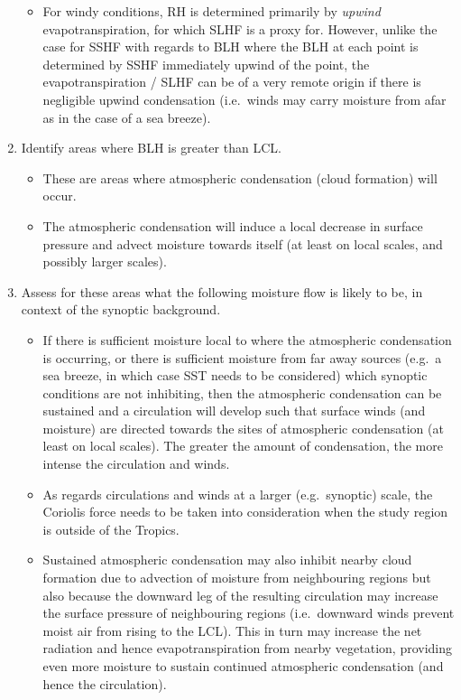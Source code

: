 \begin{enumerate}
\begin{itemize}
		\item For windy conditions, \ac{RH} is determined primarily by \textit{upwind} evapotranspiration, for which \ac{SLHF} is a proxy for. However, unlike the case for \ac{SSHF} with regards to \ac{BLH} where the \ac{BLH} at each point is determined by \ac{SSHF} immediately upwind of the point, the evapotranspiration / \ac{SLHF} can be of a very remote origin if there is negligible upwind condensation (i.e.\ winds may carry moisture from afar as in the case of a sea breeze).
	\end{itemize}
	\item Identify areas where \ac{BLH} is greater than \ac{LCL}.
	\begin{itemize}
		\item These are areas where atmospheric condensation (cloud formation) will occur.
		\item The atmospheric condensation will induce a local decrease in surface pressure and advect moisture towards itself (at least on local scales, and possibly larger scales).
	\end{itemize}
	\item Assess for these areas what the following moisture flow is likely to be, in context of the synoptic background.
	\begin{itemize}
		\item If there is sufficient moisture local to where the atmospheric condensation is occurring, or there is sufficient moisture from far away sources (e.g.\ a sea breeze, in which case \ac{SST} needs to be considered) which synoptic conditions are not inhibiting, then the atmospheric condensation can be sustained and a circulation will develop such that surface winds (and moisture) are directed towards the sites of atmospheric condensation (at least on local scales). The greater the amount of condensation, the more intense the circulation and winds.
		\item As regards circulations and winds at a larger (e.g.\ synoptic) scale, the Coriolis force needs to be taken into consideration when the study region is outside of the Tropics.
		\item Sustained atmospheric condensation may also inhibit nearby cloud formation due to advection of moisture from neighbouring regions but also because the downward leg of the resulting circulation may increase the surface pressure of neighbouring regions (i.e.\ downward winds prevent moist air from rising to the \ac{LCL}). This in turn may increase the net radiation and hence evapotranspiration from nearby vegetation, providing even more moisture to sustain continued atmospheric condensation (and hence the circulation).

\end{itemize}
\end{enumerate}
